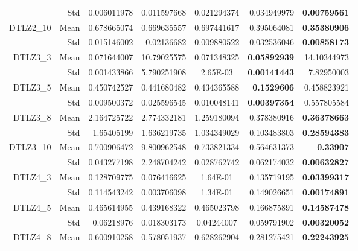 \begin{table*}[htbp]
\begin{tabular}{rrrrrrr}
          & Std   & 0.006011978 & 0.011597668 & \multicolumn{1}{c}{0.021294374} & 0.034949979 & \textbf{0.00759561} \\
    \multirow{2}[0]{*}{DTLZ2\_10} & Mean  & 0.678665074 & 0.669635557 & \multicolumn{1}{c}{0.697441617} & 0.395064081 & \textbf{0.35380906} \\
          & Std   & 0.015146002 & 0.02136682 & \multicolumn{1}{c}{0.009880522} & 0.032536046 & \textbf{0.00858173} \\
    \multirow{2}[0]{*}{DTLZ3\_3} & Mean  & 0.071644007 & 10.79025575 & \multicolumn{1}{c}{0.071348325} & \textbf{0.05892939} & 14.10344973 \\
          & Std   & 0.001433866 & 5.790251908 & \multicolumn{1}{c}{2.65E-03} & \textbf{0.00141443} & 7.82950003 \\
    \multirow{2}[0]{*}{DTLZ3\_5} & Mean  & 0.450742527 & 0.441680482 & \multicolumn{1}{c}{0.434365588} & \textbf{0.1529606} & 0.458823921 \\
          & Std   & 0.009500372 & 0.025596545 & \multicolumn{1}{c}{0.010048141} & \textbf{0.00397354} & 0.557805584 \\
    \multirow{2}[0]{*}{DTLZ3\_8} & Mean  & 2.164725722 & 2.774332181 & \multicolumn{1}{c}{1.259180094} & 0.378380916 & \textbf{0.36378663} \\
          & Std   & 1.65405199 & 1.636219735 & \multicolumn{1}{c}{1.034349029} & 0.103483803 & \textbf{0.28594383} \\
    \multirow{2}[0]{*}{DTLZ3\_10} & Mean  & 0.700906472 & 9.800962548 & \multicolumn{1}{c}{0.733821334} & 0.564631373 & \textbf{0.33907} \\
          & Std   & 0.043277198 & 2.248704242 & \multicolumn{1}{c}{0.028762742} & 0.062174032 & \textbf{0.00632827} \\
    \multirow{2}[0]{*}{DTLZ4\_3} & Mean  & 0.128709775 & 0.076416625 & \multicolumn{1}{c}{1.64E-01} & 0.135719195 & \textbf{0.03399317} \\
          & Std   & 0.114543242 & 0.003706098 & \multicolumn{1}{c}{1.34E-01} & 0.149026651 & \textbf{0.00174891} \\
    \multirow{2}[0]{*}{DTLZ4\_5} & Mean  & 0.465614955 & 0.439168322 & \multicolumn{1}{c}{0.465023798} & 0.166875891 & \textbf{0.14587478} \\
          & Std   & 0.06218976 & 0.018303173 & \multicolumn{1}{c}{0.04244007} & 0.059791902 & \textbf{0.00320052} \\
    \multirow{2}[0]{*}{DTLZ4\_8} & Mean  & 0.600910258 & 0.578051937 & \multicolumn{1}{c}{0.628262904} & 0.281275421 & \textbf{0.22243925} \\

\end{tabular}
\end{table*}
